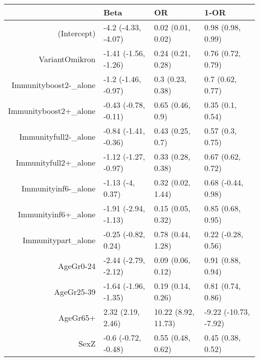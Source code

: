 \begin{table}[ht]
\centering
\begin{tabular}{rlll}
  \hline
 & Beta & OR & 1-OR \\ 
  \hline
(Intercept) & -4.2 (-4.33, -4.07) & 0.02 (0.01, 0.02) & 0.98 (0.98, 0.99) \\ 
  VariantOmikron & -1.41 (-1.56, -1.26) & 0.24 (0.21, 0.28) & 0.76 (0.72, 0.79) \\ 
  Immunityboost2-\_alone & -1.2 (-1.46, -0.97) & 0.3 (0.23, 0.38) & 0.7 (0.62, 0.77) \\ 
  Immunityboost2+\_alone & -0.43 (-0.78, -0.11) & 0.65 (0.46, 0.9) & 0.35 (0.1, 0.54) \\ 
  Immunityfull2-\_alone & -0.84 (-1.41, -0.36) & 0.43 (0.25, 0.7) & 0.57 (0.3, 0.75) \\ 
  Immunityfull2+\_alone & -1.12 (-1.27, -0.97) & 0.33 (0.28, 0.38) & 0.67 (0.62, 0.72) \\ 
  Immunityinf6-\_alone & -1.13 (-4, 0.37) & 0.32 (0.02, 1.44) & 0.68 (-0.44, 0.98) \\ 
  Immunityinf6+\_alone & -1.91 (-2.94, -1.13) & 0.15 (0.05, 0.32) & 0.85 (0.68, 0.95) \\ 
  Immunitypart\_alone & -0.25 (-0.82, 0.24) & 0.78 (0.44, 1.28) & 0.22 (-0.28, 0.56) \\ 
  AgeGr0-24 & -2.44 (-2.79, -2.12) & 0.09 (0.06, 0.12) & 0.91 (0.88, 0.94) \\ 
  AgeGr25-39 & -1.64 (-1.96, -1.35) & 0.19 (0.14, 0.26) & 0.81 (0.74, 0.86) \\ 
  AgeGr65+ & 2.32 (2.19, 2.46) & 10.22 (8.92, 11.73) & -9.22 (-10.73, -7.92) \\ 
  SexZ & -0.6 (-0.72, -0.48) & 0.55 (0.48, 0.62) & 0.45 (0.38, 0.52) \\ 
   \hline
\end{tabular}
\end{table}
